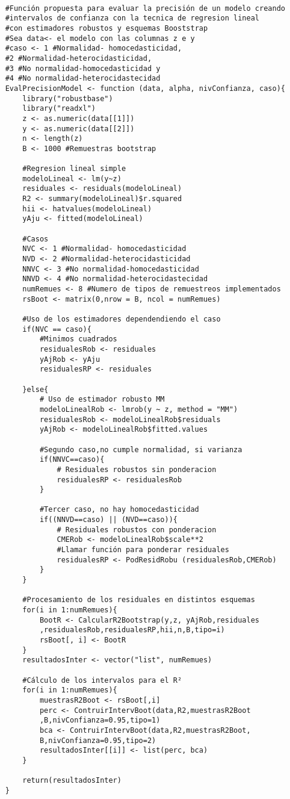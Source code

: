 \begin{verbatim}
	
	#Función propuesta para evaluar la precisión de un modelo creando
	#intervalos de confianza con la tecnica de regresion lineal
	#con estimadores robustos y esquemas Booststrap
	#Sea data<- el modelo con las columnas z e y
	#caso <- 1 #Normalidad- homocedasticidad,
	#2 #Normalidad-heterocidasticidad,
	#3 #No normalidad-homocedasticidad y 
	#4 #No normalidad-heterocidastecidad 
	EvalPrecisionModel <- function (data, alpha, nivConfianza, caso){
		library("robustbase")
		library("readxl")
		z <- as.numeric(data[[1]])
		y <- as.numeric(data[[2]])
		n <- length(z)
		B <- 1000 #Remuestras bootstrap
		
		#Regresion lineal simple
		modeloLineal <- lm(y~z)
		residuales <- residuals(modeloLineal)
		R2 <- summary(modeloLineal)$r.squared
		hii <- hatvalues(modeloLineal)
		yAju <- fitted(modeloLineal)
		
		#Casos
		NVC <- 1 #Normalidad- homocedasticidad
		NVD <- 2 #Normalidad-heterocidasticidad
		NNVC <- 3 #No normalidad-homocedasticidad
		NNVD <- 4 #No normalidad-heterocidastecidad 
		numRemues <- 8 #Numero de tipos de remuestreos implementados
		rsBoot <- matrix(0,nrow = B, ncol = numRemues)
		
		#Uso de los estimadores dependendiendo el caso
		if(NVC == caso){
			#Minimos cuadrados
			residualesRob <- residuales
			yAjRob <- yAju
			residualesRP <- residuales
			
		}else{
			# Uso de estimador robusto MM  
			modeloLinealRob <- lmrob(y ~ z, method = "MM")
			residualesRob <- modeloLinealRob$residuals
			yAjRob <- modeloLinealRob$fitted.values
			
			#Segundo caso,no cumple normalidad, si varianza
			if(NNVC==caso){
				# Residuales robustos sin ponderacion
				residualesRP <- residualesRob
			}
			
			#Tercer caso, no hay homocedasticidad
			if((NNVD==caso) || (NVD==caso)){
				# Residuales robustos con ponderacion
				CMERob <- modeloLinealRob$scale**2
				#Llamar función para ponderar residuales
				residualesRP <- PodResidRobu (residualesRob,CMERob)
			}
		}
		
		#Procesamiento de los residuales en distintos esquemas
		for(i in 1:numRemues){
			BootR <- CalcularR2Bootstrap(y,z, yAjRob,residuales
			,residualesRob,residualesRP,hii,n,B,tipo=i)
			rsBoot[, i] <- BootR
		}
		resultadosInter <- vector("list", numRemues)
		
		#Cálculo de los intervalos para el R²
		for(i in 1:numRemues){
			muestrasR2Boot <- rsBoot[,i]
			perc <- ContruirIntervBoot(data,R2,muestrasR2Boot
			,B,nivConfianza=0.95,tipo=1)
			bca <- ContruirIntervBoot(data,R2,muestrasR2Boot,
			B,nivConfianza=0.95,tipo=2)
			resultadosInter[[i]] <- list(perc, bca)
		}
		
		return(resultadosInter)
	}
\end{verbatim}

